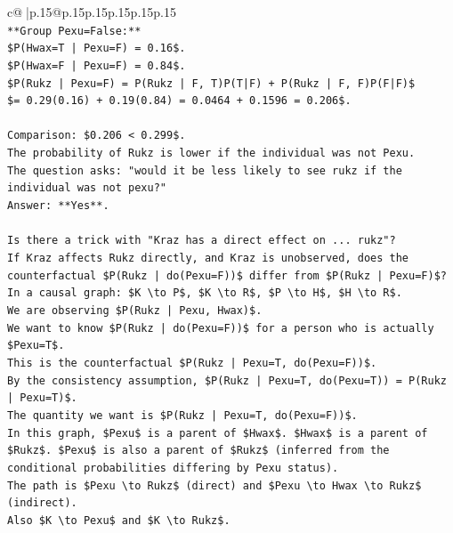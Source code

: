 \documentclass{article}
\begin{document}
{\begin{supertabular}{c@{$\;$}|p{.15\linewidth}@{}p{.15\linewidth}p{.15\linewidth}p{.15\linewidth}p{.15\linewidth}p{.15\linewidth}}
{{{\\ 
\texttt{**Group Pexu=False:**} \\
\texttt{\$P(Hwax=T | Pexu=F) = 0.16\$.} \\
\texttt{\$P(Hwax=F | Pexu=F) = 0.84\$.} \\
\texttt{\$P(Rukz | Pexu=F) = P(Rukz | F, T)P(T|F) + P(Rukz | F, F)P(F|F)\$} \\
\texttt{\$= 0.29(0.16) + 0.19(0.84) = 0.0464 + 0.1596 = 0.206\$.} \\
\\ 
\texttt{Comparison: \$0.206 < 0.299\$.} \\
\texttt{The probability of Rukz is lower if the individual was not Pexu.} \\
\texttt{The question asks: "would it be less likely to see rukz if the individual was not pexu?"} \\
\texttt{Answer: **Yes**.} \\
\\ 
\texttt{Is there a trick with "Kraz has a direct effect on ... rukz"?} \\
\texttt{If Kraz affects Rukz directly, and Kraz is unobserved, does the counterfactual \$P(Rukz | do(Pexu=F))\$ differ from \$P(Rukz | Pexu=F)\$?} \\
\texttt{In a causal graph: \$K \textbackslash{}to P\$, \$K \textbackslash{}to R\$, \$P \textbackslash{}to H\$, \$H \textbackslash{}to R\$.} \\
\texttt{We are observing \$P(Rukz | Pexu, Hwax)\$.} \\
\texttt{We want to know \$P(Rukz | do(Pexu=F))\$ for a person who is actually \$Pexu=T\$.} \\
\texttt{This is the counterfactual \$P(Rukz | Pexu=T, do(Pexu=F))\$.} \\
\texttt{By the consistency assumption, \$P(Rukz | Pexu=T, do(Pexu=T)) = P(Rukz | Pexu=T)\$.} \\
\texttt{The quantity we want is \$P(Rukz | Pexu=T, do(Pexu=F))\$.} \\
\texttt{In this graph, \$Pexu\$ is a parent of \$Hwax\$. \$Hwax\$ is a parent of \$Rukz\$. \$Pexu\$ is also a parent of \$Rukz\$ (inferred from the conditional probabilities differing by Pexu status).} \\
\texttt{The path is \$Pexu \textbackslash{}to Rukz\$ (direct) and \$Pexu \textbackslash{}to Hwax \textbackslash{}to Rukz\$ (indirect).} \\
\texttt{Also \$K \textbackslash{}to Pexu\$ and \$K \textbackslash{}to Rukz\$.} \\
}}}
\end{supertabular}}
\end{document}
